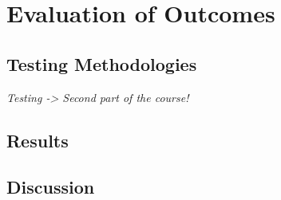 %
%
\chapter{Evaluation of Outcomes}

\section{Testing Methodologies}

\textit{Testing -> Second part of the course!}

\section{Results}

\section{Discussion}

\clearpage